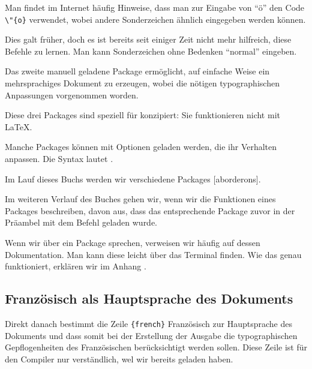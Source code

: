 \begin{plusloins}
Man findet im Internet häufig Hinweise, dass man zur Eingabe von \enquote{ö} den Code \verb|\"{o}| verwendet, wobei andere Sonderzeichen ähnlich eingegeben werden können. 

Dies galt früher, doch es ist bereits seit einiger Zeit nicht mehr hilfreich, diese Befehle zu lernen. Man kann Sonderzeichen ohne Bedenken \enquote{normal} eingeben. 
\end{plusloins}

Das zweite manuell geladene Package  ermöglicht, auf einfache Weise ein mehrsprachiges Dokument zu erzeugen, wobei die nötigen typographischen Anpassungen vorgenommen worden.

Diese drei Packages sind speziell für \XeLaTeX konzipiert: Sie funktionieren nicht mit  \LaTeX.

Manche Packages können mit Optionen geladen werden, die ihr Verhalten anpassen. Die Syntax lautet .

Im Lauf dieses Buchs werden wir verschiedene Packages [aborderons].


\begin{attention}
Im weiteren Verlauf des Buches gehen wir, wenn wir die Funktionen eines Packages beschreiben, davon aus, dass das entsprechende Package zuvor in der Präambel mit dem Befehl  geladen wurde.
\end{attention}

\begin{plusloins}
Wenn wir über ein Package sprechen, verweisen wir häufig auf dessen Dokumentation. Man kann diese leicht über das Terminal finden. Wie das genau funktioniert, erklären wir im Anhang .
\end{plusloins}

\subsection{Französisch als Hauptsprache des Dokuments\label{french}}

Direkt danach bestimmt die Zeile \verb|{french}| Französisch zur Hauptsprache des Dokuments und dass somit bei der Erstellung der Ausgabe die typographischen Gepflogenheiten des Französischen berücksichtigt werden sollen. Diese Zeile ist für den Compiler nur verständlich, wel wir bereits  geladen haben. 

